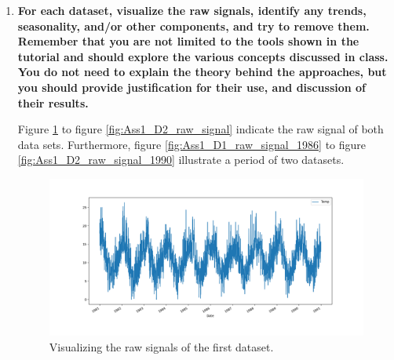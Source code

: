 \documentclass[12pt]{article}
\begin{document}

\pagebreak

\begin{enumerate}



\item \textbf{For each dataset, visualize the raw signals, identify any trends, seasonality, and/or other components, and try to remove them. Remember that you are not limited to the tools shown in the tutorial and should explore the various concepts discussed in class. You do not need to explain the theory behind the approaches, but you should provide justification for their use, and discussion of their results.}


Figure \ref{fig:Ass1_D1_raw_signal} to figure \ref{fig:Ass1_D2_raw_signal} indicate the raw signal of both data sets. Furthermore, figure \ref{fig:Ass1_D1_raw_signal_1986} to figure \ref{fig:Ass1_D2_raw_signal_1990} illustrate a period of two datasets. 

\begin{figure}[H]
    \centering
    \begin{minipage}[b]{1\textwidth}
        \includegraphics[width=\textwidth]{figures/Ass1/Ass1_D1_raw_signal.png}
    \end{minipage}
    \caption{Visualizing the raw signals of the first dataset.}
    \label{fig:Ass1_D1_raw_signal}
\end{figure}


\end{enumerate}
\end{document}
